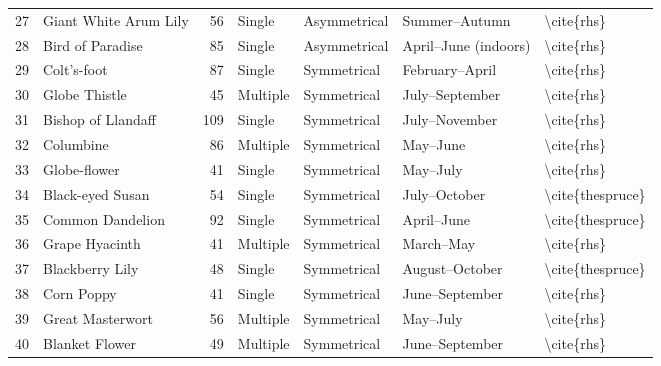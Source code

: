 \begin{table}
\begin{tabular}{rlrllll}
    27 &     Giant White Arum Lily &           56 &      Single & Asymmetrical &            Summer–Autumn &              \textbackslash cite\{rhs\} \\
    28 &          Bird of Paradise &           85 &      Single & Asymmetrical &     April–June (indoors) &              \textbackslash cite\{rhs\} \\
    29 &               Colt's-foot &           87 &      Single &  Symmetrical &           February–April &              \textbackslash cite\{rhs\} \\
    30 &             Globe Thistle &           45 &    Multiple &  Symmetrical &           July–September &              \textbackslash cite\{rhs\} \\
    31 &        Bishop of Llandaff &          109 &      Single &  Symmetrical &            July–November &              \textbackslash cite\{rhs\} \\
    32 &                 Columbine &           86 &    Multiple &  Symmetrical &                 May–June &              \textbackslash cite\{rhs\} \\
    33 &              Globe-flower &           41 &      Single &  Symmetrical &                 May–July &              \textbackslash cite\{rhs\} \\
    34 &          Black-eyed Susan &           54 &      Single &  Symmetrical &             July–October &        \textbackslash cite\{thespruce\} \\
    35 &          Common Dandelion &           92 &      Single &  Symmetrical &               April–June &        \textbackslash cite\{thespruce\} \\
    36 &            Grape Hyacinth &           41 &    Multiple &  Symmetrical &                March–May &              \textbackslash cite\{rhs\} \\
    37 &           Blackberry Lily &           48 &      Single &  Symmetrical &           August–October &        \textbackslash cite\{thespruce\} \\
    38 &                Corn Poppy &           41 &      Single &  Symmetrical &           June–September &              \textbackslash cite\{rhs\} \\
    39 &          Great Masterwort &           56 &    Multiple &  Symmetrical &                 May–July &              \textbackslash cite\{rhs\} \\
    40 &            Blanket Flower &           49 &    Multiple &  Symmetrical &           June–September &              \textbackslash cite\{rhs\} \\

\end{tabular}
\end{table}

